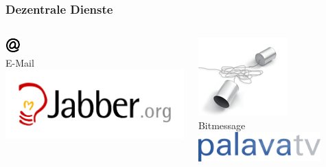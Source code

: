 \documentclass[12pt]{beamer}
\begin{document}
\begin{frame}
  \frametitle{Dezentrale Dienste}
    \begin{columns}
        \begin{column}{5cm}
            \begin{center}
                \includegraphics[height=0.2\textheight]{img/mail.pdf} \\
                E-Mail \\
                \vspace{1cm}
                \includegraphics[height=0.2\textheight]{img/jabber.png}
            \end{center}
        \end{column}
        \begin{column}{5cm}
            \begin{center}
                \includegraphics[height=0.2\textheight]{img/bitmessagelogo.png} \\
                Bitmessage \\
                \vspace{1cm}
                \includegraphics[width=0.8\textwidth]{img/palava-tv.png}
            \end{center}
        \end{column}
    \end{columns}
\end{frame}
\end{document}
